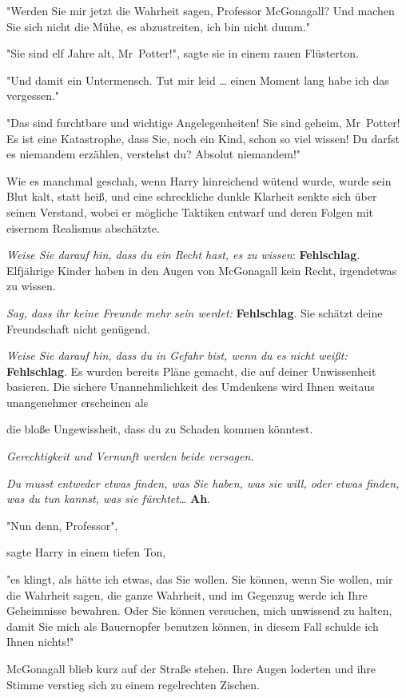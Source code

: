 {"Werden Sie mir jetzt die Wahrheit sagen, Professor McGonagall? Und machen Sie sich nicht die Mühe, es abzustreiten, ich bin nicht dumm."

"Sie sind elf Jahre alt, Mr~Potter!", sagte sie in einem rauen Flüsterton.

"Und damit ein Untermensch. Tut mir leid … einen Moment lang habe ich das vergessen."

"Das sind furchtbare und wichtige Angelegenheiten! Sie sind geheim, Mr~Potter! Es ist eine Katastrophe, dass Sie, noch ein Kind, schon so viel wissen! Du darfst es niemandem erzählen, verstehst du? Absolut niemandem!"

Wie es manchmal geschah, wenn Harry hinreichend wütend wurde, wurde sein Blut kalt, statt heiß, und eine schreckliche dunkle Klarheit senkte sich über seinen Verstand, wobei er mögliche Taktiken entwarf und deren Folgen mit eisernem Realismus abschätzte.

\emph{Weise Sie darauf hin, dass du ein Recht hast, es zu wissen}: \textbf{Fehlschlag}. Elfjährige Kinder haben in den Augen von McGonagall kein Recht, irgendetwas zu wissen.

\emph{Sag, dass ihr keine Freunde mehr sein werdet:} \textbf{Fehlschlag}. Sie schätzt deine Freundschaft nicht genügend.

\emph{Weise Sie darauf hin, dass du in Gefahr bist, wenn du es nicht weißt:} \textbf{Fehlschlag}. Es wurden bereits Pläne gemacht, die auf deiner Unwissenheit basieren. Die sichere Unannehmlichkeit des Umdenkens wird Ihnen weitaus unangenehmer erscheinen als

die bloße Ungewissheit, dass du zu Schaden kommen könntest.

\emph{Gerechtigkeit und Vernunft werden beide versagen.}

\emph{Du musst entweder etwas finden, was Sie haben, was sie will, oder etwas finden, was du tun kannst, was sie fürchtet}… \textbf{Ah}.

"Nun denn, Professor",

sagte Harry in einem tiefen Ton,

"es klingt, als hätte ich etwas, das Sie wollen. Sie können, wenn Sie wollen, mir die Wahrheit sagen, die ganze Wahrheit, und im Gegenzug werde ich Ihre Geheimnisse bewahren. Oder Sie können versuchen, mich unwissend zu halten, damit Sie mich als Bauernopfer benutzen können, in diesem Fall schulde ich Ihnen nichts!"

McGonagall blieb kurz auf der Straße stehen. Ihre Augen loderten und ihre Stimme verstieg sich zu einem regelrechten Zischen.

}
